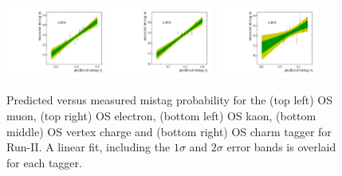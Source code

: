 \begin{figure}[hp]
\includegraphics[height=!,width=0.3\textwidth]{figs/Tagging/Run2/OS_nnetKaon_Calibration.pdf}
\includegraphics[height=!,width=0.3\textwidth]{figs/Tagging/Run2/VtxCharge_Calibration.pdf}
\includegraphics[height=!,width=0.3\textwidth]{figs/Tagging/Run2/OS_Charm_Calibration.pdf}
\caption{\small Predicted versus measured mistag probability for the (top left) OS muon, (top right) OS electron, (bottom left) OS kaon, (bottom middle) OS vertex charge
and (bottom right) OS charm tagger for Run-II. 
A linear fit, including the $1\sigma$ and $2\sigma$ error bands is overlaid for each tagger.}
\label{fig:OSdistribution_Run2}
\end{figure}




